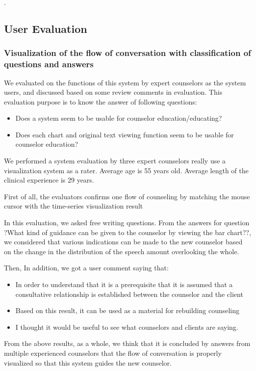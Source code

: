 \documentclass[review]{elsarticle}
\begin{document}
.
\subsection{User Evaluation}
\subsubsection{Visualization of the flow of conversation with classification of questions and answers}

We evaluated on the functions of this system by expert counselors as the system users, and discussed based on some review comments in evaluation. This evaluation purpose is to know the answer of following questions:
  \begin{itemize}
\item Does a system seem to be usable for counselor education/educating?
\item Does each chart and original text viewing function seem to be usable for counselor education?
\end{itemize}

We performed a system evaluation by three expert counselors really use a visualization system as a rater. Average age is 55 years old. Average length of the clinical experience is 29 years.

First of all, the evaluators confirms one flow of counseling by matching the mouse cursor with the time-series visualization result

  In this evaluation, we asked free writing questions. From the answers for question ?What kind of guidance can be given to the counselor by viewing the bar chart??, we considered that various indications can be made to the new counselor based on the change in the distribution of the speech amount overlooking the whole.

  Then, In addition, we got a user comment saying that:
  \begin{itemize}
\item In order to understand that it is a prerequisite that it is assumed that a consultative relationship is established between the counselor and the client
\item Based on this result, it can be used as a material for rebuilding counseling
\item I thought it would be useful to see what counselors and clients are saying.
\end{itemize}

  From the above results, as a whole, we think that it is concluded by answers from multiple experienced counselors that the flow of conversation is properly visualized so that this system guides the new counselor.
\end{document}
